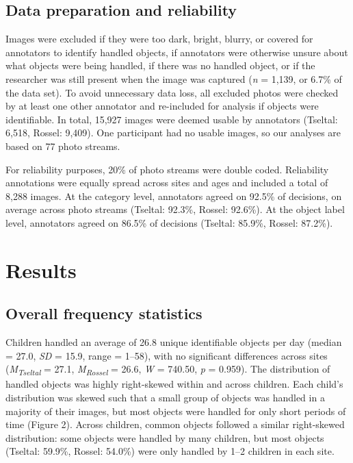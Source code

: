 \documentclass[10pt, letterpaper]{article}
\begin{document}
\hypertarget{data-preparation-and-reliability}{%
\subsection{Data preparation and
reliability}\label{data-preparation-and-reliability}}

Images were excluded if they were too dark, bright, blurry, or covered
for annotators to identify handled objects, if annotators were otherwise
unsure about what objects were being handled, if there was no handled
object, or if the researcher was still present when the image was
captured (\emph{n} = 1,139, or 6.7\% of the data set). To avoid
unnecessary data loss, all excluded photos were checked by at least one
other annotator and re-included for analysis if objects were
identifiable. In total, 15,927 images were deemed usable by annotators
(Tseltal: 6,518, Rossel: 9,409). One participant had no usable images,
so our analyses are based on 77 photo streams.

For reliability purposes, 20\% of photo streams were double coded.
Reliability annotations were equally spread across sites and ages and
included a total of 8,288 images. At the category level, annotators
agreed on 92.5\% of decisions, on average across photo streams (Tseltal:
92.3\%, Rossel: 92.6\%). At the object label level, annotators agreed on
86.5\% of decisions (Tseltal: 85.9\%, Rossel: 87.2\%).

\hypertarget{results}{%
\section{Results}\label{results}}

\hypertarget{overall-frequency-statistics}{%
\subsection{Overall frequency
statistics}\label{overall-frequency-statistics}}

Children handled an average of 26.8 unique identifiable objects per day
(median = 27.0, \emph{SD} = 15.9, range = 1--58), with no significant
differences across sites (\emph{M}\textsubscript{\emph{Tseltal}} = 27.1,
\emph{M}\textsubscript{\emph{Rossel}} = 26.6, \emph{W} = 740.50,
\emph{p} = 0.959). The distribution of handled objects was highly
right-skewed within and across children. Each child's distribution was
skewed such that a small group of objects was handled in a majority of
their images, but most objects were handled for only short periods of
time (Figure 2). Across children, common objects followed a similar
right-skewed distribution: some objects were handled by many children,
but most objects (Tseltal: 59.9\%, Rossel: 54.0\%) were only handled by
1--2 children in each site.
\end{document}

